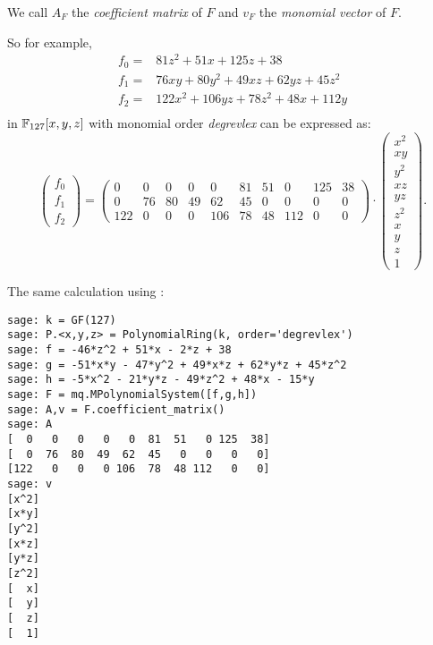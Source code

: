 We call $A_F$ the \emph{coefficient matrix} of $F$ and $v_F$ the \emph{monomial vector} of $F$.

So for example,\begin{align*}
f_0 = & 81 z^{2} + 51 x + 125 z + 38\\
f_1 = & 76 x y + 80 y^{2} + 49 x z + 62 y z + 45 z^{2}\\
f_2 = & 122 x^{2} + 106 y z + 78 z^{2} + 48 x + 112 y\\
\end{align*}
in $\mathbb{F}_{127}[x, y, z]$ with monomial order \emph{degrevlex} can be expressed as:
\[
\left(\begin{array}{r} f_0\\
 f_1\\
 f_2 \end{array}\right) =
\left(\begin{array}{rrrrrrrrrr}
0 & 0 & 0 & 0 & 0 & 81 & 51 & 0 & 125 & 38 \\
0 & 76 & 80 & 49 & 62 & 45 & 0 & 0 & 0 & 0 \\
122 & 0 & 0 & 0 & 106 & 78 & 48 & 112 & 0 & 0
\end{array}\right)
\cdot
\left(\begin{array}{r}
x^{2} \\
x y \\
y^{2} \\
x z \\
y z \\
z^{2} \\
x \\
y \\
z \\
1
\end{array}\right).
\]

The same calculation using \Sage:
\begin{lstlisting}
sage: k = GF(127)
sage: P.<x,y,z> = PolynomialRing(k, order='degrevlex')
sage: f = -46*z^2 + 51*x - 2*z + 38
sage: g = -51*x*y - 47*y^2 + 49*x*z + 62*y*z + 45*z^2
sage: h = -5*x^2 - 21*y*z - 49*z^2 + 48*x - 15*y
sage: F = mq.MPolynomialSystem([f,g,h])
sage: A,v = F.coefficient_matrix()
sage: A
[  0   0   0   0   0  81  51   0 125  38]
[  0  76  80  49  62  45   0   0   0   0]
[122   0   0   0 106  78  48 112   0   0]
sage: v
[x^2]
[x*y]
[y^2]
[x*z]
[y*z]
[z^2]
[  x]
[  y]
[  z]
[  1]
\end{lstlisting}

